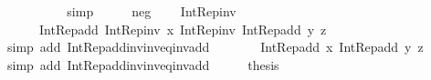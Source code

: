 \begin{isabellebody}
\ \ \ \ {\isacharparenright}{\kern0pt}{\isachardoublequoteclose}\isanewline
\ \ \ \ \isamarkupfalse%
\ simp\isanewline
\ \ \isamarkupfalse%
\ \isamarkupfalse%
\ neg\ \isamarkupfalse%
\ {\isachardoublequoteopen}{\isachardot}{\kern0pt}{\isachardot}{\kern0pt}{\isachardot}{\kern0pt}\ {\isacharequal}{\kern0pt}\ Int{\isacharunderscore}{\kern0pt}Rep{\isacharunderscore}{\kern0pt}inv\ {\isacharparenleft}{\kern0pt}\isanewline
\ \ \ \ \ \ Int{\isacharunderscore}{\kern0pt}Rep{\isacharunderscore}{\kern0pt}add\ {\isacharparenleft}{\kern0pt}Int{\isacharunderscore}{\kern0pt}Rep{\isacharunderscore}{\kern0pt}inv\ x{\isacharparenright}{\kern0pt}\ {\isacharparenleft}{\kern0pt}Int{\isacharunderscore}{\kern0pt}Rep{\isacharunderscore}{\kern0pt}inv\ {\isacharparenleft}{\kern0pt}Int{\isacharunderscore}{\kern0pt}Rep{\isacharunderscore}{\kern0pt}add\ y\ z{\isacharparenright}{\kern0pt}{\isacharparenright}{\kern0pt}\isanewline
\ \ \ \ {\isacharparenright}{\kern0pt}{\isachardoublequoteclose}\isanewline
\ \ \ \ \isamarkupfalse%
\ {\isacharparenleft}{\kern0pt}simp\ add{\isacharcolon}{\kern0pt}\ Int{\isacharunderscore}{\kern0pt}Rep{\isacharunderscore}{\kern0pt}add{\isacharunderscore}{\kern0pt}inv{\isacharunderscore}{\kern0pt}inv{\isacharunderscore}{\kern0pt}eq{\isacharunderscore}{\kern0pt}inv{\isacharunderscore}{\kern0pt}add{\isacharparenright}{\kern0pt}\isanewline
\ \ \isamarkupfalse%
\ \isamarkupfalse%
\ {\isachardoublequoteopen}{\isachardot}{\kern0pt}{\isachardot}{\kern0pt}{\isachardot}{\kern0pt}\ {\isacharequal}{\kern0pt}\ Int{\isacharunderscore}{\kern0pt}Rep{\isacharunderscore}{\kern0pt}add\ x\ {\isacharparenleft}{\kern0pt}Int{\isacharunderscore}{\kern0pt}Rep{\isacharunderscore}{\kern0pt}add\ y\ z{\isacharparenright}{\kern0pt}{\isachardoublequoteclose}\isanewline
\ \ \ \ \isamarkupfalse%
\ {\isacharparenleft}{\kern0pt}simp\ add{\isacharcolon}{\kern0pt}\ Int{\isacharunderscore}{\kern0pt}Rep{\isacharunderscore}{\kern0pt}add{\isacharunderscore}{\kern0pt}inv{\isacharunderscore}{\kern0pt}inv{\isacharunderscore}{\kern0pt}eq{\isacharunderscore}{\kern0pt}inv{\isacharunderscore}{\kern0pt}add{\isacharparenright}{\kern0pt}\isanewline
\ \ \isamarkupfalse%
\ \isamarkupfalse%
\ {\isacharquery}{\kern0pt}thesis\ \isacommand{{\isachardot}{\kern0pt}}\isamarkupfalse%
\isanewline
{}\isamarkupfalse%
%
\endisatagproof
{\isafoldproof}%
%
\isadelimproof
\isanewline
%
\endisadelimproof
\isanewline
{}\isamarkupfalse%

\end{isabellebody}
